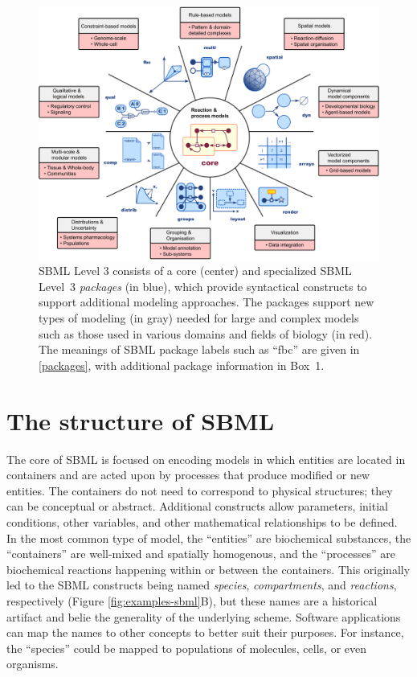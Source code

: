 \documentclass{sbml-paper}
\begin{document}
\begin{figure}[b]
  \center
  \includegraphics[width=\textwidth]{resources/SBML-Level3-v09.pdf}
\caption{SBML Level 3 consists of a core (center) and specialized SBML Level~3 \emph{packages} (in blue), which provide syntactical constructs to support additional modeling approaches. The packages support new types of modeling (in gray) needed for large and complex models such as those used in various domains and fields of biology (in red). The meanings of SBML package labels such as ``fbc'' are given in \autoref{packages}, with additional package information in Box~1.}
\label{level-3-diagram}
\end{figure}

\clearpage
\newpage

\section*{The structure of SBML}
\label{sec:sbml}

The core of SBML is focused on encoding models in which entities are located in containers and are acted upon by processes that produce modified or new entities.  The containers do not need to correspond to physical structures; they can be conceptual or abstract.  Additional constructs allow parameters, initial conditions, other variables, and other mathematical relationships to be defined.  In the most common type of model, the ``entities'' are biochemical substances, the ``containers'' are well-mixed and spatially homogenous, and the ``processes'' are biochemical reactions happening within or between the containers.  This originally led to the SBML constructs being named \emph{species}, \emph{compartments}, and \emph{reactions}, respectively (Figure \ref{fig:examples-sbml}B), but these names are a historical artifact and belie the generality of the underlying scheme.  Software applications can map the names to other concepts to better suit their purposes.  For instance, the ``species'' could be mapped to populations of molecules, cells, or even organisms.
\end{document}
